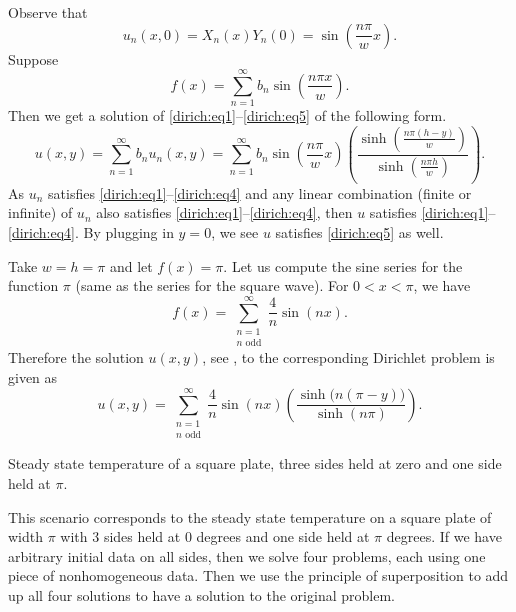 Observe that
\begin{equation*}
u_n(x,0) = X_n(x)Y_n(0) = \sin \left( \frac{n \pi}{w} x \right) .
\end{equation*}
Suppose
\begin{equation*}
f(x) =
\sum_{n=1}^\infty
b_n \sin \left( \frac{n \pi x }{w} \right) .
\end{equation*}
Then we get a solution of \eqref{dirich:eq1}--\eqref{dirich:eq5} of the
following form.
\begin{equation*}
\boxed{
~~
u(x,y) =
\sum_{n=1}^\infty
b_n u_n(x,y)
=
\sum_{n=1}^\infty
b_n 
\sin \left( \frac{n \pi}{w} x \right)
\left( \frac{\sinh \left( \frac{n \pi (h-y) }{w} \right)}%
{\sinh \left( \frac{n \pi h }{w} \right)} \right)
.
~~
}
\end{equation*}
As $u_n$ satisfies \eqref{dirich:eq1}--\eqref{dirich:eq4} and any linear
combination (finite or infinite) of $u_n$ also satisfies 
\eqref{dirich:eq1}--\eqref{dirich:eq4}, then $u$ satisfies
\eqref{dirich:eq1}--\eqref{dirich:eq4}.
By plugging in $y=0$, we see $u$
satisfies 
\eqref{dirich:eq5} as well.

\begin{example}
Take $w=h=\pi$ and let $f(x) = \pi$.  Let us compute the sine
series for the function $\pi$ (same as the series for the square wave).
For $0 < x < \pi$, we have
\begin{equation*}
f(x) =
\sum_{\substack{n=1 \\ n \text{ odd}}}^\infty
\frac{4}{n}
\sin (n x) .
\end{equation*}
Therefore the solution $u(x,y)$, see ,
to the corresponding Dirichlet problem is
given as
\begin{equation*}
u(x,y) =
\sum_{\substack{n=1 \\ n \text{ odd}}}^\infty
\frac{4}{n}
\sin (n x)
\left( \frac{\sinh \bigl( n (\pi-y) \bigr) }{\sinh (n \pi)} \right)
.
\end{equation*}

\begin{myfig}
\capstart
{}
\caption{Steady state temperature of a square plate, three sides
held at zero and one side held at $\pi$.\label{dirichsquareplot:fig}}
\end{myfig}
\end{example}

This scenario
corresponds to the steady state temperature on a square plate of width $\pi$
with 3 sides held at 0 degrees and one side held at $\pi$ degrees.
If we have arbitrary initial data on all sides, then we solve four problems,
each using one piece of nonhomogeneous data.  Then we use the principle of
superposition to add up all four solutions to have a solution to the
original problem.

